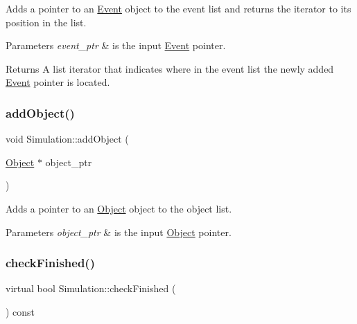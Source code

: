 Adds a pointer to an \hyperlink{class_event}{Event} object to the event list and returns the iterator to its position in the list. 


\begin{DoxyParams}{Parameters}
{\em event\+\_\+ptr} & is the input \hyperlink{class_event}{Event} pointer. \\
\hline
\end{DoxyParams}
\begin{DoxyReturn}{Returns}
A list iterator that indicates where in the event list the newly added \hyperlink{class_event}{Event} pointer is located. 
\end{DoxyReturn}
\mbox{\label{class_simulation_a1e0f43c4e11eda5486054c250f4de08f}} 
\subsubsection{\texorpdfstring{add\+Object()}{addObject()}}
{\footnotesize\ttfamily void Simulation\+::add\+Object (\begin{DoxyParamCaption}\item[{\hyperlink{class_object}{Object} $\ast$}]{object\+\_\+ptr }\end{DoxyParamCaption})\hspace{0.3cm}{\ttfamily [protected]}}



Adds a pointer to an \hyperlink{class_object}{Object} object to the object list. 


\begin{DoxyParams}{Parameters}
{\em object\+\_\+ptr} & is the input \hyperlink{class_object}{Object} pointer. \\
\hline
\end{DoxyParams}
\mbox{\label{class_simulation_af69bb46977a3a0084214a194c888e16c}} 
\subsubsection{\texorpdfstring{check\+Finished()}{checkFinished()}}
{\footnotesize\ttfamily virtual bool Simulation\+::check\+Finished (\begin{DoxyParamCaption}{ }\end{DoxyParamCaption}) const\hspace{0.3cm}{\ttfamily [pure virtual]}}



